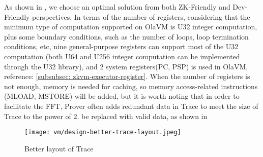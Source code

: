 As shown in , we choose an optimal solution from both ZK-Friendly and Dev-Friendly perspectives. In terms of the number of
registers, considering that the minimum type of computation supported on OlaVM is U32 integer computation, plus some boundary conditions,
such as the number of loops, loop termination conditions, etc, nine general-purpose registers can support most of the U32 computation
(both U64 and U256 integer computation can be implemented through the U32 library), and 2 system registers(PC, PSP) is used in OlaVM, reference: \ref{subsubsec: zkvm-executor-register}. 
When the number of registers is not enough, memory is needed for caching, so memory access-related instructions
(MLOAD, MSTORE) will be added, but it is worth noting that in order to facilitate the FFT, Prover often adds redundant data in Trace to meet
the size of Trace to the power of 2. be replaced with valid data, as shown in 

\begin{figure}[!ht]
    \centering
    \texttt{[image: vm/design-better-trace-layout.jpeg]}
    \caption{Better layout of Trace}
    \label{fig:design-better-trace-layout}
\end{figure}
